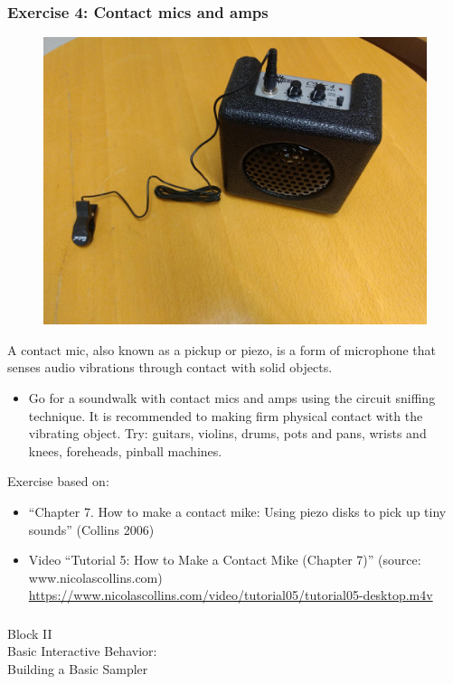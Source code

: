 \documentclass[screen, aspectratio=43]{beamer}
\begin{document}
\begin{frame}
  \frametitle{Exercise 4: Contact mics and amps}
 \begin{figure}
	\includegraphics[scale=0.05]{img/contactmics.jpg}
\end{figure}  

  {\scriptsize 
  A contact mic, also known as a pickup or piezo, is a form of microphone that senses audio vibrations through contact with solid objects.
  \begin{itemize}
    \item Go for a soundwalk with contact mics and amps using the circuit sniffing technique. It is recommended to making firm physical contact with the vibrating object. Try: guitars, violins, drums, pots and pans, wrists and knees, foreheads, pinball machines.     
  \end{itemize}
  }
  {\tiny Exercise based on:	  
    \begin{itemize}
	\item ``Chapter 7. How to make a contact mike: Using piezo disks to pick up tiny sounds'' (Collins 2006)
	\item Video ``Tutorial 5: How to Make a Contact Mike (Chapter 7)'' (source: www.nicolascollins.com)\\
	\url{https://www.nicolascollins.com/video/tutorial05/tutorial05-desktop.m4v}
    \end{itemize}
   } 
\end{frame}
%

\usebackgroundtemplate{}
\begin{frame}
\frametitle{}
{\huge Block II\\ Basic Interactive Behavior:\\ Building a Basic Sampler}
\end{frame}
\end{document}
